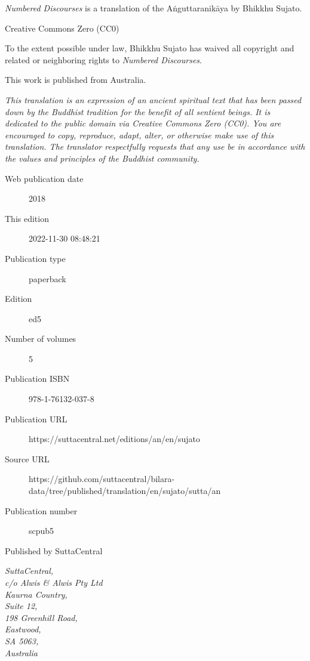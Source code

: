 \documentclass[12pt,openany]{book}%
\begin{document}
\begin{footnotesize}

\textit{Numbered Discourses} is a translation of the Aṅguttaranikāya by Bhikkhu Sujato.

\medskip

Creative Commons Zero (CC0)

To the extent possible under law, Bhikkhu Sujato has waived all copyright and related or neighboring rights to \textit{Numbered Discourses}.

\medskip

This work is published from Australia.

\begin{center}
\textit{This translation is an expression of an ancient spiritual text that has been passed down by the Buddhist tradition for the benefit of all sentient beings. It is dedicated to the public domain via Creative Commons Zero (CC0). You are encouraged to copy, reproduce, adapt, alter, or otherwise make use of this translation. The translator respectfully requests that any use be in accordance with the values and principles of the Buddhist community.}
\end{center}

\medskip

\begin{description}
    \item[Web publication date] 2018
    \item[This edition] 2022-11-30 08:48:21
    \item[Publication type] paperback
    \item[Edition] ed5
    \item[Number of volumes] 5
    \item[Publication ISBN] 978-1-76132-037-8
    \item[Publication URL] https://suttacentral.net/editions/an/en/sujato
    \item[Source URL] https://github.com/suttacentral/bilara-data/tree/published/translation/en/sujato/sutta/an
    \item[Publication number] scpub5
\end{description}

\medskip

Published by SuttaCentral

\medskip

\textit{SuttaCentral,\\
c/o Alwis \& Alwis Pty Ltd\\
Kaurna Country,\\
Suite 12,\\
198 Greenhill Road,\\
Eastwood,\\
SA 5063,\\
Australia}

\end{footnotesize}
\end{document}
